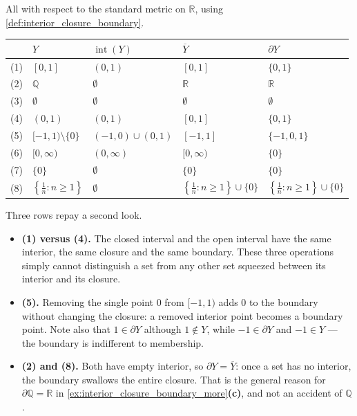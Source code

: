 \begin{exercisesolution}
All with respect to the standard metric on $\mathbb{R}$, using
\cref{def:interior_closure_boundary}.
\begin{center}
\begin{tabular}{@{}c l l l l@{}}
& \textbf{$Y$} & \textbf{$\operatorname{int}(Y)$} & \textbf{$\overline{Y}$} & \textbf{$\partial Y$} \\
\hline
(1) & $[0,1]$ & $(0,1)$ & $[0,1]$ & $\{0,1\}$ \\
(2) & $\mathbb{Q}$ & $\emptyset$ & $\mathbb{R}$ & $\mathbb{R}$ \\
(3) & $\emptyset$ & $\emptyset$ & $\emptyset$ & $\emptyset$ \\
(4) & $(0,1)$ & $(0,1)$ & $[0,1]$ & $\{0,1\}$ \\
(5) & $[-1,1)\setminus\{0\}$ & $(-1,0)\cup(0,1)$ & $[-1,1]$ & $\{-1,0,1\}$ \\
(6) & $[0,\infty)$ & $(0,\infty)$ & $[0,\infty)$ & $\{0\}$ \\
(7) & $\{0\}$ & $\emptyset$ & $\{0\}$ & $\{0\}$ \\
(8) & $\left\{\tfrac1n : n \geq 1\right\}$ & $\emptyset$ &
  $\left\{\tfrac1n : n \geq 1\right\}\cup\{0\}$ &
  $\left\{\tfrac1n : n \geq 1\right\}\cup\{0\}$ \\
\end{tabular}
\end{center}

Three rows repay a second look.
\begin{itemize}
  \item \textbf{(1) versus (4).} The closed interval and the open interval have the same
    interior, the same closure and the same boundary. These three operations simply cannot
    distinguish a set from any other set squeezed between its interior and its closure.
  \item \textbf{(5).} Removing the single point $0$ from $[-1,1)$ adds $0$ to the boundary
    without changing the closure: a removed interior point becomes a boundary point. Note also
    that $1 \in \partial Y$ although $1 \notin Y$, while $-1 \in \partial Y$ and $-1 \in Y$ ---
    the boundary is indifferent to membership.
  \item \textbf{(2) and (8).} Both have empty interior, so $\partial Y = \overline{Y}$: once a
    set has no interior, the boundary swallows the entire closure. That is the general reason
    for $\partial\mathbb{Q} = \mathbb{R}$ in
    \cref{ex:interior_closure_boundary_more}\textbf{(c)}, and not an accident of $\mathbb{Q}$.
\end{itemize}
\end{exercisesolution}

